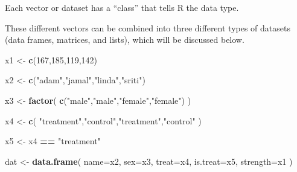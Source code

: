 \documentclass[]{book}
\newenvironment{Shaded}{\begin{snugshade}}{\end{snugshade}}
\newcommand{\DataTypeTok}[1]{\textcolor[rgb]{0.13,0.29,0.53}{#1}}
\newcommand{\DecValTok}[1]{\textcolor[rgb]{0.00,0.00,0.81}{#1}}
\newcommand{\KeywordTok}[1]{\textcolor[rgb]{0.13,0.29,0.53}{\textbf{#1}}}
\newcommand{\NormalTok}[1]{#1}
\newcommand{\OperatorTok}[1]{\textcolor[rgb]{0.81,0.36,0.00}{\textbf{#1}}}
\newcommand{\StringTok}[1]{\textcolor[rgb]{0.31,0.60,0.02}{#1}}
\theoremstyle{definition}
\theoremstyle{definition}
\theoremstyle{definition}
\theoremstyle{remark}
\begin{document}
Each vector or dataset has a ``class'' that tells R the data type.

These different vectors can be combined into three different types of
datasets (data frames, matrices, and lists), which will be discussed
below.

\begin{Shaded}
\begin{Highlighting}[]

\NormalTok{x1 <-}\StringTok{ }\KeywordTok{c}\NormalTok{(}\DecValTok{167}\NormalTok{,}\DecValTok{185}\NormalTok{,}\DecValTok{119}\NormalTok{,}\DecValTok{142}\NormalTok{)}

\NormalTok{x2 <-}\StringTok{ }\KeywordTok{c}\NormalTok{(}\StringTok{"adam"}\NormalTok{,}\StringTok{"jamal"}\NormalTok{,}\StringTok{"linda"}\NormalTok{,}\StringTok{"sriti"}\NormalTok{)}

\NormalTok{x3 <-}\StringTok{ }\KeywordTok{factor}\NormalTok{( }\KeywordTok{c}\NormalTok{(}\StringTok{"male"}\NormalTok{,}\StringTok{"male"}\NormalTok{,}\StringTok{"female"}\NormalTok{,}\StringTok{"female"}\NormalTok{) )}

\NormalTok{x4 <-}\StringTok{ }\KeywordTok{c}\NormalTok{( }\StringTok{"treatment"}\NormalTok{,}\StringTok{"control"}\NormalTok{,}\StringTok{"treatment"}\NormalTok{,}\StringTok{"control"}\NormalTok{ )}

\NormalTok{x5 <-}\StringTok{ }\NormalTok{x4 }\OperatorTok{==}\StringTok{ "treatment"}

\NormalTok{dat <-}\StringTok{ }\KeywordTok{data.frame}\NormalTok{( }\DataTypeTok{name=}\NormalTok{x2, }\DataTypeTok{sex=}\NormalTok{x3, }\DataTypeTok{treat=}\NormalTok{x4, }\DataTypeTok{is.treat=}\NormalTok{x5, }\DataTypeTok{strength=}\NormalTok{x1 )}
\end{Highlighting}
\end{Shaded}
\end{document}
